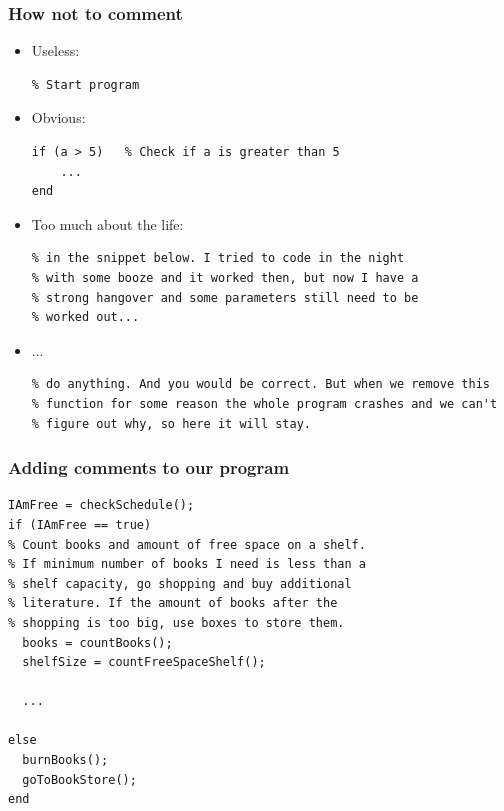 \begin{frame}[fragile]
 \frametitle{How not to comment}
 \begin{itemize}[<+->]
  \item Useless:
  \begin{lstlisting}
% Start program 
  \end{lstlisting}
  \item Obvious:
  \begin{lstlisting}
if (a > 5)   % Check if a is greater than 5
    ... 
end\end{lstlisting}
  \item Too much about the life:
  \begin{lstlisting}[basicstyle=\tiny\ttfamily]
% Well... I do not know how to explain what is going on
% in the snippet below. I tried to code in the night 
% with some booze and it worked then, but now I have a 
% strong hangover and some parameters still need to be
% worked out...
  \end{lstlisting}

  \item ...
  \begin{lstlisting}[basicstyle=\tiny\ttfamily]
% You may think that this function is obsolete, and doesn't seem to
% do anything. And you would be correct. But when we remove this 
% function for some reason the whole program crashes and we can't 
% figure out why, so here it will stay.
  \end{lstlisting}
 \end{itemize}
\end{frame}

\begin{frame}[fragile]
 \frametitle{Adding comments to our program}
 \centering{}
 \begin{lstlisting}
IAmFree = checkSchedule();
if (IAmFree == true)
% Count books and amount of free space on a shelf. 
% If minimum number of books I need is less than a 
% shelf capacity, go shopping and buy additional 
% literature. If the amount of books after the 
% shopping is too big, use boxes to store them.
  books = countBooks();
  shelfSize = countFreeSpaceShelf();
  
  ...

else
  burnBooks();
  goToBookStore();
end
 \end{lstlisting}
\end{frame}

